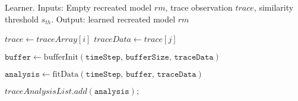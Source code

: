\documentclass{article}
\newcommand{\vars}{\texttt}
\newcommand{\func}{\textrm}
\begin{document}
		
	\begin{algorithm}
		\caption{Learner. Inputs: Empty recreated model $rm$, trace observation $trace$, similarity threshold $s_{th}$. Output: learned recreated model $rm$}
		\label{learner}
		\begin{algorithmic}[1]
			\State $trace\gets traceArray[i]$
			\State $traceData\gets trace[j]$
			
			\State $\vars{buffer} \gets \func{bufferInit}(\vars{timeStep, bufferSize, traceData})$
			
			\State $\vars{analysis} \gets \func{fitData} (\vars{timeStep, buffer, traceData})$
			
			\State $traceAnalysisList.add(\vars{analysis});$
			\EndIf						
			\EndFor
			\EndFor
			\EndProcedure
		\end{algorithmic}
	\end{algorithm}
\end{document}
